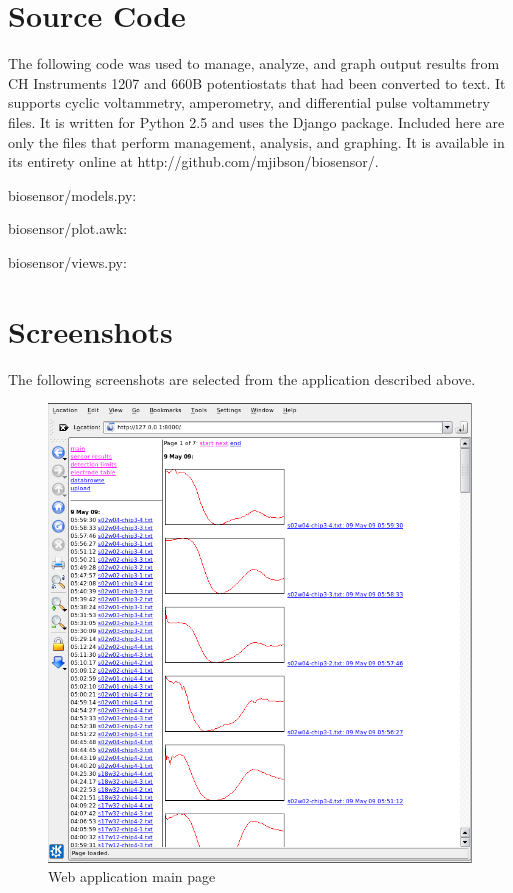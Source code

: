 \appendix

\chapter{Source Code}

The following code was used to manage, analyze, and graph output results from CH Instruments 1207 and 660B potentiostats that had been converted to text. It supports cyclic voltammetry, amperometry, and differential pulse voltammetry files. It is written for Python 2.5 and uses the Django package. Included here are only the files that perform management, analysis, and graphing. It is available in its entirety online at http://github.com/mjibson/biosensor/.

\singlespacing
\lstset{language=Python,basicstyle=\tiny,breaklines,tabsize=2}

biosensor/models.py:


biosensor/plot.awk:


biosensor/views.py:


\chapter{Screenshots}

The following screenshots are selected from the application described above.

\begin{figure}
	\centering
	\includegraphics[width=\linewidth]{figures/web-main.png}
	\caption{Web application main page}
\end{figure}

